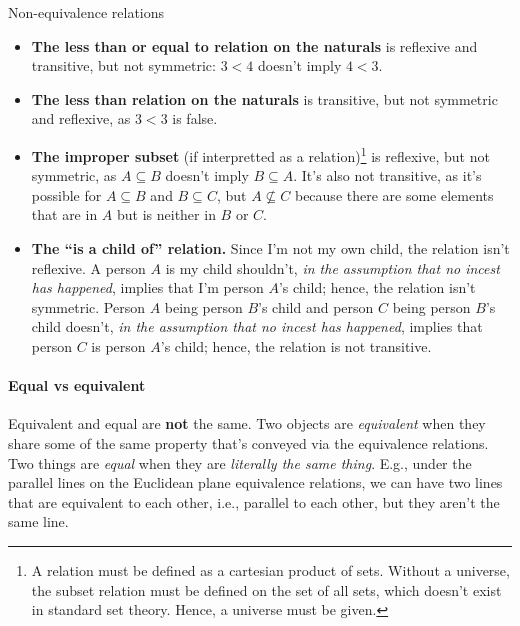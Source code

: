 \begin{exmp}{Non-equivalence relations}{}
  \begin{itemize}
    \item \textbf{The less than or equal to relation on the naturals} is reflexive and transitive,
          but not symmetric: \(3 < 4\) doesn't imply \(4 < 3\).
    \item \textbf{The less than relation on the naturals} is transitive, but not symmetric and
          reflexive, as \(3 < 3\) is false.
    \item \textbf{The improper subset} (if interpretted as a relation)\footnote{A relation must be
          defined as a cartesian product of sets. Without a universe, the subset relation must be
          defined on the set of all sets, which doesn't exist in standard set theory. Hence, a
          universe must be given.} is reflexive, but not symmetric, as \(A \subseteq B\) doesn't
          imply \(B \subseteq A\). It's also not transitive, as it's possible for \(A \subseteq B\)
          and \(B \subseteq C\), but \(A \nsubseteq C\) because there are some elements that are in
          \(A\) but is neither in \(B\) or \(C\).
    \item \textbf{The \enquote{is a child of} relation.} Since I'm not my own child, the relation
          isn't reflexive. A person \(A\) is my child shouldn't, \emph{in the assumption that no
          incest has happened}, implies that I'm person \(A\)'s child; hence, the relation isn't
          symmetric. Person \(A\) being person \(B\)'s child and person \(C\) being person \(B\)'s
          child doesn't, \emph{in the assumption that no incest has happened}, implies that person
          \(C\) is person \(A\)'s child; hence, the relation is not transitive.
  \end{itemize}
\end{exmp}

\paragraph{Equal vs equivalent}

Equivalent and equal are \textbf{not} the same. Two objects are \emph{equivalent} when they share
some of the same property that's conveyed via the equivalence relations. Two things are \emph{equal}
when they are \emph{literally the same thing}. E.g., under the parallel lines on the Euclidean plane
equivalence relations, we can have two lines that are equivalent to each other, i.e., parallel to
each other, but they aren't the same line.


